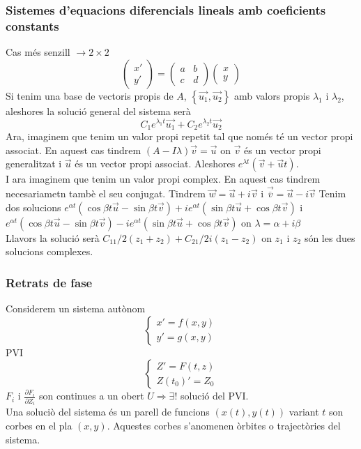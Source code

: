\documentclass[../main.tex]{subfiles}
\begin{document}
\subsubsection{Sistemes d'equacions diferencials lineals amb coeficients constants}
Cas més senzill $\rightarrow 2\times2$
\begin{displaymath}
	\begin{pmatrix}x'\\y'\end{pmatrix} = \begin{pmatrix}a & b\\c & d\end{pmatrix}\begin{pmatrix}x\\y\end{pmatrix}
\end{displaymath}
Si tenim una base de vectoris propis de $A$, $\left\{\vec{u_1}, \vec{u_2}\right\}$ amb valors propis $\lambda_1$ i $\lambda_2$, aleshores la solució general del sistema serà
\begin{displaymath}
	C_1e^{\lambda_1t}\vec{u_1} + C_2e^{\lambda_2t}\vec{u_2}
\end{displaymath}
Ara, imaginem que tenim un valor propi repetit tal que només té un vector propi associat. En aquest cas tindrem
$(A-I\lambda)\vec{v} = \vec{u}$ on $\vec{v}$ és un vector propi generalitzat i $\vec{u}$ és un vector propi associat. Aleshores $e^{\lambda t}(\vec{v}+\vec{u}t)$.\\
I ara imaginem que tenim un valor propi complex. En aquest cas tindrem necesariametn tambè el seu conjugat. Tindrem $\vec{w} = \vec{u} + i\vec{v}$ i $\vec{\overline{v}} = \vec{u} - i\vec{v}$
Tenim dos solucions $e^{\alpha t}(\cos{\beta t} \vec{u} - \sin{\beta t}\vec{v}) + ie^{\alpha t}(\sin{\beta t}\vec{u} + \cos{\beta t}\vec{v})$
i $e^{\alpha t}(\cos{\beta t} \vec{u} - \sin{\beta t}\vec{v}) - ie^{\alpha t}(\sin{\beta t}\vec{u} + \cos{\beta t}\vec{v})$ on $\lambda = \alpha + i\beta$\\
Llavors la solució serà $C_11/2(z_1 + z_2) + C_21/{2i}(z_1-z_2)$ on $z_1$ i $z_2$ són les dues solucions complexes.
\subsubsection{Retrats de fase}
Considerem un sistema autònom
\begin{displaymath}
	\begin{cases}
		x' = f(x, y)\\
		y' = g(x, y)
	\end{cases}
\end{displaymath}
PVI
\begin{displaymath}
	\begin{cases}
		Z' = F(t, z)\\
		Z(t_0)' = Z_0
	\end{cases}
\end{displaymath}
$F_i$ i $\frac{\partial F_i}{\partial Z_i}$ son continues a un obert $U \Rightarrow \exists!$ solució del PVI.\\
Una soluciò del sistema és un parell de funcions $(x(t),y(t))$ variant $t$ son corbes en el pla $(x,y)$. Aquestes corbes s'anomenen òrbites o trajectòries del sistema.\\
\end{document}
